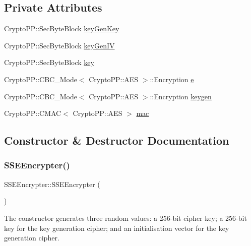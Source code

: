 \subsection*{Private Attributes}
\begin{DoxyCompactItemize}
\item 
Crypto\+P\+P\+::\+Sec\+Byte\+Block \hyperlink{classSSEEncrypter_a35dbd89d8820118bf71d6cd483e64ac8}{key\+Gen\+Key}
\item 
Crypto\+P\+P\+::\+Sec\+Byte\+Block \hyperlink{classSSEEncrypter_ab6fb0b44e024a40077fd44672ad78f28}{key\+Gen\+IV}
\item 
Crypto\+P\+P\+::\+Sec\+Byte\+Block \hyperlink{classSSEEncrypter_afc4ceb0c421614857c18b152a976c29a}{key}
\item 
Crypto\+P\+P\+::\+C\+B\+C\+\_\+\+Mode$<$ Crypto\+P\+P\+::\+A\+ES $>$\+::Encryption \hyperlink{classSSEEncrypter_a2831d301099a3d5548479996e3c8cf4b}{e}
\item 
Crypto\+P\+P\+::\+C\+B\+C\+\_\+\+Mode$<$ Crypto\+P\+P\+::\+A\+ES $>$\+::Encryption \hyperlink{classSSEEncrypter_a43d9006f3db0d57fa02069977946335b}{keygen}
\item 
Crypto\+P\+P\+::\+C\+M\+AC$<$ Crypto\+P\+P\+::\+A\+ES $>$ \hyperlink{classSSEEncrypter_a67939726bb84cb761535642873c3b10c}{mac}
\end{DoxyCompactItemize}


\subsection{Constructor \& Destructor Documentation}
\mbox{\label{classSSEEncrypter_a4b45442fa1025d82ed499241da4796bf}} 
\subsubsection{\texorpdfstring{S\+S\+E\+Encrypter()}{SSEEncrypter()}\hspace{0.1cm}{\footnotesize\ttfamily [1/2]}}
{\footnotesize\ttfamily S\+S\+E\+Encrypter\+::\+S\+S\+E\+Encrypter (\begin{DoxyParamCaption}{ }\end{DoxyParamCaption})}

The constructor generates three random values\+: a 256-\/bit cipher key; a 256-\/bit key for the key generation cipher; and an initialisation vector for the key generation cipher. \mbox{\label{classSSEEncrypter_ae109735e8bf9f5a32d6f481e6d208bd8}} 
